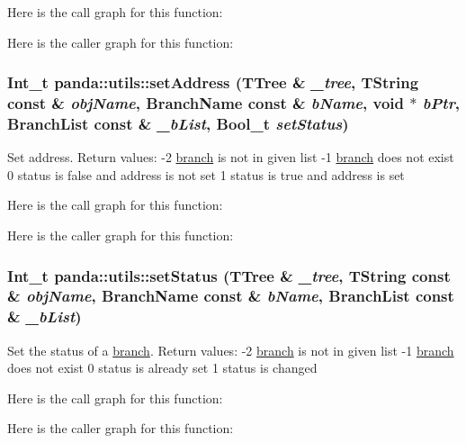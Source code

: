 Here is the call graph for this function:

Here is the caller graph for this function:\hypertarget{namespacepanda_1_1utils_abf9c62e588560197c2bae9932e6a6e05}{
\subsubsection[{setAddress}]{\setlength{\rightskip}{0pt plus 5cm}Int\_\-t panda::utils::setAddress (TTree \& {\em \_\-tree}, \/  TString const \& {\em objName}, \/  BranchName const \& {\em bName}, \/  void $\ast$ {\em bPtr}, \/  BranchList const \& {\em \_\-bList}, \/  Bool\_\-t {\em setStatus})}}
\label{namespacepanda_1_1utils_abf9c62e588560197c2bae9932e6a6e05}


Set address. Return values: -\/2 \hyperlink{namespacepanda_1_1branch}{branch} is not in given list -\/1 \hyperlink{namespacepanda_1_1branch}{branch} does not exist 0 status is false and address is not set 1 status is true and address is set 

Here is the call graph for this function:

Here is the caller graph for this function:\hypertarget{namespacepanda_1_1utils_a01665f786d6a2acedb8f008f3fc9fc84}{
\subsubsection[{setStatus}]{\setlength{\rightskip}{0pt plus 5cm}Int\_\-t panda::utils::setStatus (TTree \& {\em \_\-tree}, \/  TString const \& {\em objName}, \/  BranchName const \& {\em bName}, \/  BranchList const \& {\em \_\-bList})}}
\label{namespacepanda_1_1utils_a01665f786d6a2acedb8f008f3fc9fc84}


Set the status of a \hyperlink{namespacepanda_1_1branch}{branch}. Return values: -\/2 \hyperlink{namespacepanda_1_1branch}{branch} is not in given list -\/1 \hyperlink{namespacepanda_1_1branch}{branch} does not exist 0 status is already set 1 status is changed 

Here is the call graph for this function:

Here is the caller graph for this function: